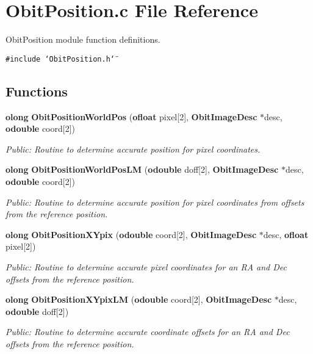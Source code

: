 \section{Obit\-Position.c File Reference}
\label{ObitPosition_8c}
Obit\-Position module function definitions. 

{\tt \#include \char`\"{}Obit\-Position.h\char`\"{}}\par
\subsection*{Functions}
\begin{CompactItemize}
\item 
{\bf olong} {\bf Obit\-Position\-World\-Pos} ({\bf ofloat} pixel[2], {\bf Obit\-Image\-Desc} $\ast$desc, {\bf odouble} coord[2])
\begin{CompactList}\small\item\em Public: Routine to determine accurate position for pixel coordinates. \item\end{CompactList}\item 
{\bf olong} {\bf Obit\-Position\-World\-Pos\-LM} ({\bf odouble} doff[2], {\bf Obit\-Image\-Desc} $\ast$desc, {\bf odouble} coord[2])
\begin{CompactList}\small\item\em Public: Routine to determine accurate position for pixel coordinates from offsets from the reference position. \item\end{CompactList}\item 
{\bf olong} {\bf Obit\-Position\-XYpix} ({\bf odouble} coord[2], {\bf Obit\-Image\-Desc} $\ast$desc, {\bf ofloat} pixel[2])
\begin{CompactList}\small\item\em Public: Routine to determine accurate pixel coordinates for an RA and Dec offsets from the reference position. \item\end{CompactList}\item 
{\bf olong} {\bf Obit\-Position\-XYpix\-LM} ({\bf odouble} coord[2], {\bf Obit\-Image\-Desc} $\ast$desc, {\bf odouble} doff[2])
\begin{CompactList}\small\item\em Public: Routine to determine accurate coordinate offsets for an RA and Dec offsets from the reference position. \item\end{CompactList}\end{CompactItemize}


